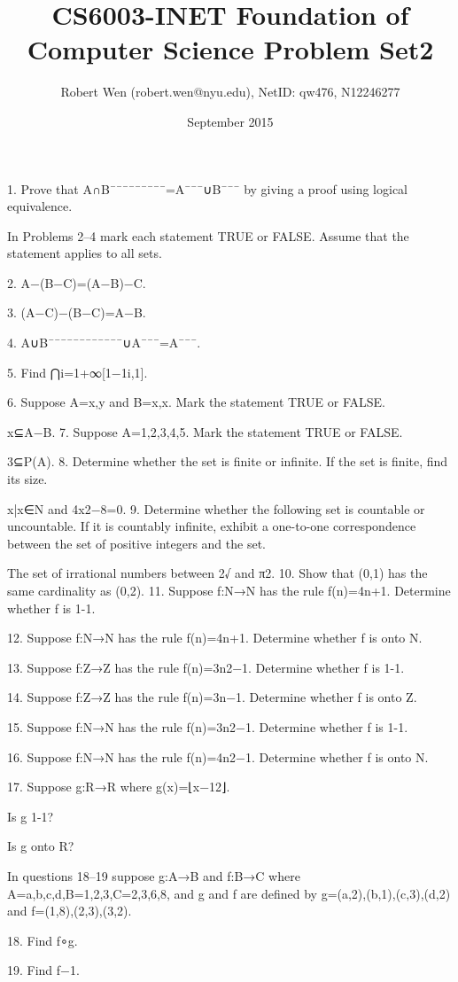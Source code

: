 \documentclass{article}
\title{CS6003-INET Foundation of Computer Science Problem Set2}
\author{Robert Wen (robert.wen@nyu.edu), NetID: qw476, N12246277}
\date{September 2015}
\begin{document}
\maketitle

1. Prove that A∩B¯¯¯¯¯¯¯¯¯=A¯¯¯∪B¯¯¯ by giving a proof using logical equivalence.
 
In Problems 2–4 mark each statement TRUE or FALSE. Assume that the statement applies to all sets. 

2. A−(B−C)=(A−B)−C.

3. (A−C)−(B−C)=A−B.

4. A∪B¯¯¯¯¯¯¯¯¯¯¯¯∪A¯¯¯=A¯¯¯. 

5. Find ⋂i=1+∞[1−1i,1]. 

6. Suppose A={x,y} and B={x,{x}}. Mark the statement TRUE or FALSE.

{x}⊆A−B.
7. Suppose A={1,2,3,4,5}. Mark the statement TRUE or FALSE.

{{3}}⊆P(A). 
8. Determine whether the set is finite or infinite. If the set is finite, find its size.

{x|x∈N and 4x2−8=0}. 
9. Determine whether the following set is countable or uncountable. If it is countably infinite, exhibit a one-to-one correspondence between the set of positive integers and the set.

The set of irrational numbers between 2√ and π2. 
10. Show that (0,1) has the same cardinality as (0,2).
11. Suppose f:N→N has the rule f(n)=4n+1. Determine whether f is 1-1.

12. Suppose f:N→N has the rule f(n)=4n+1. Determine whether f is onto N.

13. Suppose f:Z→Z has the rule f(n)=3n2−1. Determine whether f is 1-1.

14. Suppose f:Z→Z has the rule f(n)=3n−1. Determine whether f is onto Z.

15. Suppose f:N→N has the rule f(n)=3n2−1. Determine whether f is 1-1.

16. Suppose f:N→N has the rule f(n)=4n2−1. Determine whether f is onto N.

17. Suppose g:R→R where g(x)=⌊x−12⌋.

Is g 1-1?

Is g onto R?

In questions 18–19 suppose g:A→B and f:B→C where A={a,b,c,d},B={1,2,3},C={2,3,6,8}, and g and f are defined by g={(a,2),(b,1),(c,3),(d,2)} and f={(1,8),(2,3),(3,2)}.

18. Find f∘g. 

19. Find f−1.
\end{document}
